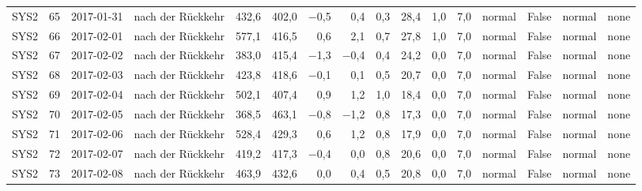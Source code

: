 \begin{tabular}{lrllrrrrrrrrlrll}
SYS2 & 65 & 2017-01-31 & nach der Rückkehr & 432,6 & 402,0 & $-$0,5 & 0,4 & 0,3 & 28,4 & 1,0 & 7,0 & normal & False & normal & none \\
SYS2 & 66 & 2017-02-01 & nach der Rückkehr & 577,1 & 416,5 & 0,6 & 2,1 & 0,7 & 27,8 & 1,0 & 7,0 & normal & False & normal & none \\
SYS2 & 67 & 2017-02-02 & nach der Rückkehr & 383,0 & 415,4 & $-$1,3 & $-$0,4 & 0,4 & 24,2 & 0,0 & 7,0 & normal & False & normal & none \\
SYS2 & 68 & 2017-02-03 & nach der Rückkehr & 423,8 & 418,6 & $-$0,1 & 0,1 & 0,5 & 20,7 & 0,0 & 7,0 & normal & False & normal & none \\
SYS2 & 69 & 2017-02-04 & nach der Rückkehr & 502,1 & 407,4 & 0,9 & 1,2 & 1,0 & 18,4 & 0,0 & 7,0 & normal & False & normal & none \\
SYS2 & 70 & 2017-02-05 & nach der Rückkehr & 368,5 & 463,1 & $-$0,8 & $-$1,2 & 0,8 & 17,3 & 0,0 & 7,0 & normal & False & normal & none \\
SYS2 & 71 & 2017-02-06 & nach der Rückkehr & 528,4 & 429,3 & 0,6 & 1,2 & 0,8 & 17,9 & 0,0 & 7,0 & normal & False & normal & none \\
SYS2 & 72 & 2017-02-07 & nach der Rückkehr & 419,2 & 417,3 & $-$0,4 & 0,0 & 0,8 & 20,6 & 0,0 & 7,0 & normal & False & normal & none \\
SYS2 & 73 & 2017-02-08 & nach der Rückkehr & 463,9 & 432,6 & 0,0 & 0,4 & 0,5 & 20,8 & 0,0 & 7,0 & normal & False & normal & none \\
\bottomrule
\end{tabular}
